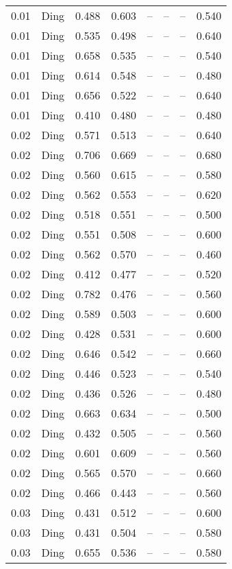 \begin{table}[H]
\begin{tabular}{l c l l l}
0.01 & Ding & 0.488 & 0.603 & -- & -- & -- & 0.540 \\
0.01 & Ding & 0.535 & 0.498 & -- & -- & -- & 0.640 \\
0.01 & Ding & 0.658 & 0.535 & -- & -- & -- & 0.540 \\
0.01 & Ding & 0.614 & 0.548 & -- & -- & -- & 0.480 \\
0.01 & Ding & 0.656 & 0.522 & -- & -- & -- & 0.640 \\
0.01 & Ding & 0.410 & 0.480 & -- & -- & -- & 0.480 \\
0.02 & Ding & 0.571 & 0.513 & -- & -- & -- & 0.640 \\
0.02 & Ding & 0.706 & 0.669 & -- & -- & -- & 0.680 \\
0.02 & Ding & 0.560 & 0.615 & -- & -- & -- & 0.580 \\
0.02 & Ding & 0.562 & 0.553 & -- & -- & -- & 0.620 \\
0.02 & Ding & 0.518 & 0.551 & -- & -- & -- & 0.500 \\
0.02 & Ding & 0.551 & 0.508 & -- & -- & -- & 0.600 \\
0.02 & Ding & 0.562 & 0.570 & -- & -- & -- & 0.460 \\
0.02 & Ding & 0.412 & 0.477 & -- & -- & -- & 0.520 \\
0.02 & Ding & 0.782 & 0.476 & -- & -- & -- & 0.560 \\
0.02 & Ding & 0.589 & 0.503 & -- & -- & -- & 0.600 \\
0.02 & Ding & 0.428 & 0.531 & -- & -- & -- & 0.600 \\
0.02 & Ding & 0.646 & 0.542 & -- & -- & -- & 0.660 \\
0.02 & Ding & 0.446 & 0.523 & -- & -- & -- & 0.540 \\
0.02 & Ding & 0.436 & 0.526 & -- & -- & -- & 0.480 \\
0.02 & Ding & 0.663 & 0.634 & -- & -- & -- & 0.500 \\
0.02 & Ding & 0.432 & 0.505 & -- & -- & -- & 0.560 \\
0.02 & Ding & 0.601 & 0.609 & -- & -- & -- & 0.560 \\
0.02 & Ding & 0.565 & 0.570 & -- & -- & -- & 0.660 \\
0.02 & Ding & 0.466 & 0.443 & -- & -- & -- & 0.560 \\
0.03 & Ding & 0.431 & 0.512 & -- & -- & -- & 0.600 \\
0.03 & Ding & 0.431 & 0.504 & -- & -- & -- & 0.580 \\
0.03 & Ding & 0.655 & 0.536 & -- & -- & -- & 0.580 \\

\end{tabular}
\end{table}
